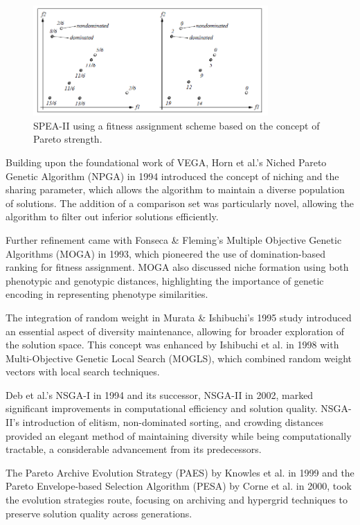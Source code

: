 \documentclass[%
 reprint,
 amsmath,amssymb,
 aps,
]{revtex4-2}
\begin{document}
\begin{figure}
\includegraphics[width=0.8\textwidth]{fig_3}
\caption{\label{fig:SPEA-II} SPEA-II using a fitness assignment scheme based on the concept of Pareto strength.}
\end{figure}

Building upon the foundational work of VEGA, Horn et al.'s Niched Pareto Genetic Algorithm (NPGA) in 1994 introduced the concept of niching and the sharing parameter, which allows the algorithm to maintain a diverse population of solutions. The addition of a comparison set was particularly novel, allowing the algorithm to filter out inferior solutions efficiently.

Further refinement came with Fonseca \& Fleming's Multiple Objective Genetic Algorithms (MOGA) in 1993, which pioneered the use of domination-based ranking for fitness assignment. MOGA also discussed niche formation using both phenotypic and genotypic distances, highlighting the importance of genetic encoding in representing phenotype similarities.

The integration of random weight in Murata \& Ishibuchi's 1995 study introduced an essential aspect of diversity maintenance, allowing for broader exploration of the solution space. This concept was enhanced by Ishibuchi et al. in 1998 with Multi-Objective Genetic Local Search (MOGLS), which combined random weight vectors with local search techniques.

Deb et al.'s NSGA-I in 1994 and its successor, NSGA-II in 2002, marked significant improvements in computational efficiency and solution quality. NSGA-II's introduction of elitism, non-dominated sorting, and crowding distances provided an elegant method of maintaining diversity while being computationally tractable, a considerable advancement from its predecessors.

The Pareto Archive Evolution Strategy (PAES) by Knowles et al. in 1999 and the Pareto Envelope-based Selection Algorithm (PESA) by Corne et al. in 2000, took the evolution strategies route, focusing on archiving and hypergrid techniques to preserve solution quality across generations.
\end{document}
